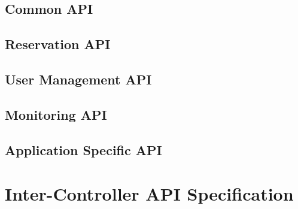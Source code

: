 \documentclass[a4paper]{report}
\newenvironment{Api}{\begin{itemize}}{\end{itemize}}
\newcommand{\ApiCode}[1]{\lstinline[style=styleApi]|#1|}
\newcommand{\ApiItem}[1]{\item #1 %

}
\newcommand{\ApiCmd}[1]{\ApiItem{\ApiCode{#1}}}
\newcommand{\ApiClass}[2]{\ApiItem{%
  \ifx&#2& \ApiCode{class #1} \else \ApiCode{class #1 extends #2} \fi}%
}
\newenvironment{ApiClassAttributes}{%

\begin{samepage}\textbf{Attributes:}\begin{compactitem}}{\end{compactitem}\end{samepage}}
\newcommand{\ApiRequired}{{\color{blue!50!black}\textbf{Required}}}
\newcommand{\ApiReadOnly}{{\color{red!50!black}\textbf{ReadOnly}}}
\newcommand{\ApiClassAttribute}[3]{\ApiItem{\ApiCode{#2} \ApiCode{#1} \hspace{1mm}(\ifx&#3&\ApiReadOnly\else#3\fi)
}}
\begin{document}


\section{Common API}




\section{Reservation API}




\section{User Management API}

\section{Monitoring API}




\section{Application Specific API}




\chapter{Inter-Controller API Specification}
\end{document}
